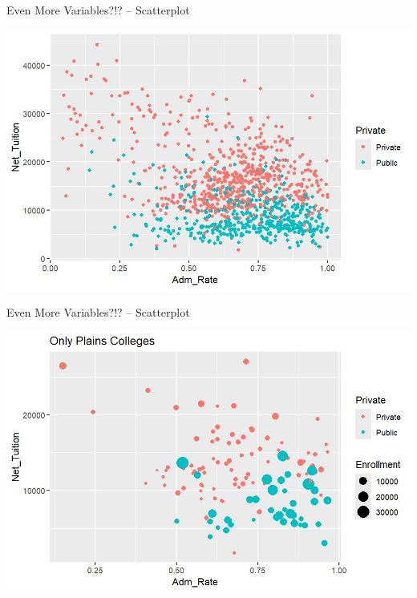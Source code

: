 \documentclass{beamer}
\begin{document}
\begin{frame}{Even More Variables?!? -- Scatterplot}
\begin{center}
\includegraphics[scale=.7]{img/scatter_by_type.jpeg}
\end{center}
\end{frame}

\begin{frame}{Even More Variables?!? -- Scatterplot}
\begin{center}
\includegraphics[scale=.7]{img/scatter_by_type_enrollment.jpeg}
\end{center}
\end{frame}
\end{document}
